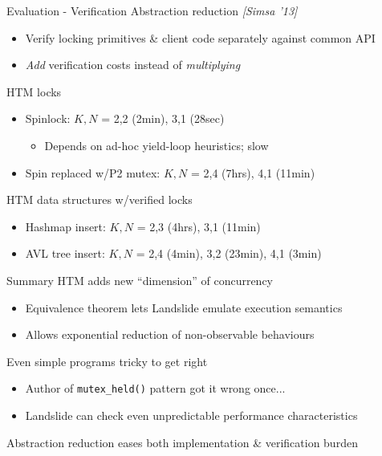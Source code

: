 \documentclass[xcolor=dvipsnames]{beamer}
\begin{document}
\begin{frame}{Evaluation - Verification}
	Abstraction reduction {\em [Simsa '13]}
	\begin{itemize}
		\item Verify locking primitives \& client code separately against common API
		\item {\em Add} verification costs instead of {\em multiplying}
	\end{itemize}
	\linegap

	HTM locks
	\begin{itemize}
		\item Spinlock: $K,N$ = 2,2 (2min), 3,1 (28sec)
			\begin{itemize}
				\item Depends on ad-hoc yield-loop heuristics; slow
			\end{itemize}
		\item Spin replaced w/P2 mutex: $K,N$ = 2,4 (7hrs), 4,1 (11min)
	\end{itemize}
	\pause
	\linegap

	HTM data structures w/verified locks
	\begin{itemize}
		\item Hashmap insert: $K,N$ = 2,3 (4hrs), 3,1 (11min)
		\item AVL tree insert: $K,N$ = 2,4 (4min), 3,2 (23min), 4,1 (3min)
	\end{itemize}
\end{frame}

\begin{frame}{Summary}
	HTM adds new ``dimension'' of concurrency
	\begin{itemize}
		\item Equivalence theorem lets Landslide emulate execution semantics
		\item Allows exponential reduction of non-observable behaviours
	\end{itemize}
	\linegap

	Even simple programs tricky to get right
	\begin{itemize}
		\item Author of {\tt mutex\_held()} pattern got it wrong once...
		\item Landslide can check even unpredictable performance characteristics
	\end{itemize}
	\linegap

	Abstraction reduction eases both implementation \& verification burden
\end{frame}
\end{document}
